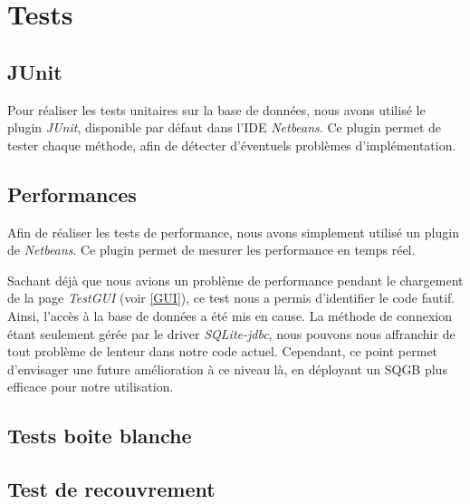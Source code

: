 \section{Tests}\label{tests}

\subsection{JUnit}

Pour réaliser les tests unitaires sur la base de données, nous avons utilisé le plugin \textit{JUnit}, disponible par défaut dans l'IDE \textit{Netbeans}.
Ce plugin permet de tester chaque méthode, afin de détecter d'éventuels problèmes d'implémentation.

\subsection{Performances}

Afin de réaliser les tests de performance, nous avons simplement utilisé un plugin de \textit{Netbeans}. Ce plugin permet de mesurer les performance en temps réel.

Sachant déjà que nous avions un problème de performance pendant le chargement de la page \textit{TestGUI} (voir \ref{GUI}), ce test nous a permis d'identifier le code fautif.
Ainsi, l'accès à la base de données a été mis en cause. La méthode de connexion étant seulement gérée par le driver \textit{SQLite-jdbc}, nous pouvons nous affranchir de tout problème de lenteur dans notre code actuel. Cependant, ce point permet d'envisager une future amélioration à ce niveau là, en déployant un SQGB plus efficace pour notre utilisation.


\subsection{Tests boite blanche}



\subsection{Test de recouvrement}